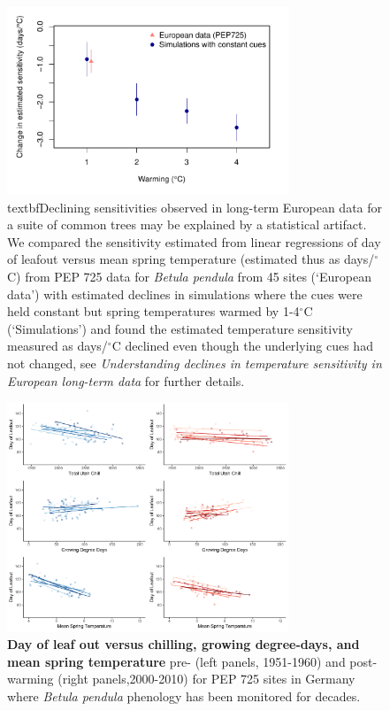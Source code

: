 \documentclass{article}
\begin{document}
\newpage
\begin{figure}[h!]
\centering
\noindent \includegraphics[width=0.75\textwidth]{..//..//analyses/bb_analysis/PEP_climate/figures/peprealandsims.pdf}
\caption{textbf{Declining sensitivities observed in long-term European data for a suite of common trees may be explained by a statistical artifact.} We compared the sensitivity estimated from linear regressions of day of leafout versus mean spring temperature (estimated thus as days/$^{\circ}$C) from PEP 725 data for \emph{Betula pendula} from 45 sites (`European data') with estimated declines in simulations where the cues were held constant but spring temperatures warmed by 1-4$^{\circ}$C (`Simulations') and found the estimated temperature sensitivity measured as days/$^{\circ}$C declined even though the underlying cues had not changed, see \emph{Understanding declines in temperature sensitivity in European long-term data} for further details.}
\label{fig:pepsims}
\end{figure}

\newpage
\begin{figure}[h!]
\centering
\noindent \includegraphics[width=0.75\textwidth]{..//..//analyses/bb_analysis/PEP_climate/figures/betpen_multruns_utahgddmat.pdf}
\caption{\textbf{Day of leaf out versus chilling, growing degree-days, and mean spring temperature} pre- (left panels, 1951-1960) and post- warming (right panels,2000-2010) for PEP 725 sites in Germany where \emph{Betula pendula} phenology has been monitored for decades.}
\label{fig:pep}
\end{figure}
\end{document}
